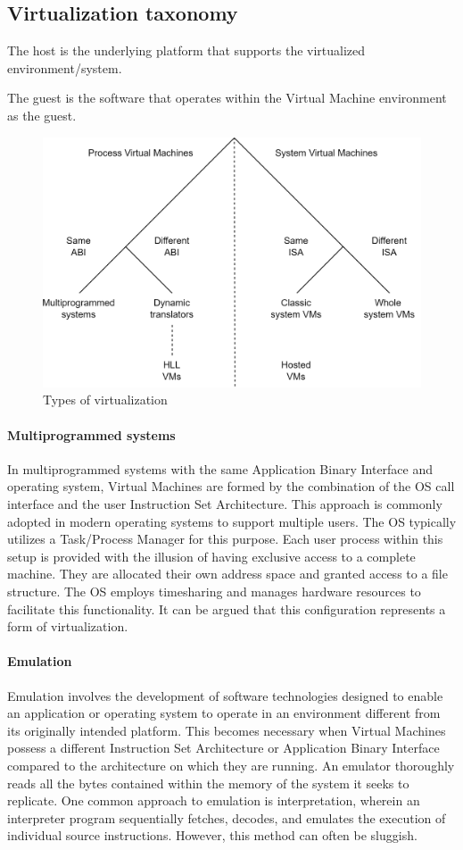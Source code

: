 \subsection{Virtualization taxonomy}
\begin{definition}
    The host is the underlying platform that supports the virtualized environment/system.
\end{definition}
\begin{definition}
    The guest is the software that operates within the Virtual Machine environment as the guest.
\end{definition}
\begin{figure}[H]
    \centering
    \includegraphics[width=0.5\linewidth]{images/vtyp.png}
    \caption{Types of virtualization}
\end{figure}

\paragraph*{Multiprogrammed systems}
In multiprogrammed systems with the same Application Binary Interface and operating system, Virtual Machines are formed by the combination of the OS call interface and the user Instruction Set Architecture. 
This approach is commonly adopted in modern operating systems to support multiple users.
The OS typically utilizes a Task/Process Manager for this purpose.
Each user process within this setup is provided with the illusion of having exclusive access to a complete machine. 
They are allocated their own address space and granted access to a file structure. 
The OS employs timesharing and manages hardware resources to facilitate this functionality. 
It can be argued that this configuration represents a form of virtualization.

\paragraph*{Emulation}
Emulation involves the development of software technologies designed to enable an application or operating system to operate in an environment different from its originally intended platform. 
This becomes necessary when Virtual Machines possess a different Instruction Set Architecture or Application Binary Interface compared to the architecture on which they are running.
An emulator thoroughly reads all the bytes contained within the memory of the system it seeks to replicate. 
One common approach to emulation is interpretation, wherein an interpreter program sequentially fetches, decodes, and emulates the execution of individual source instructions. 
However, this method can often be sluggish.

